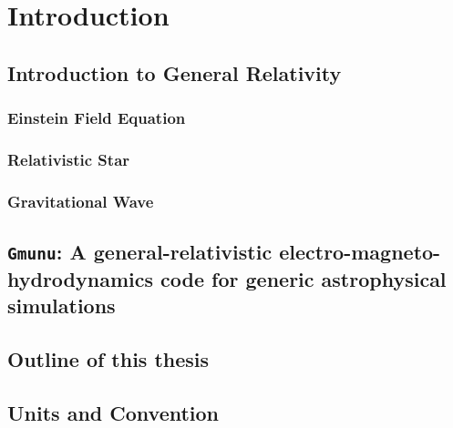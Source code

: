 
\chapter{Introduction}  %

\ifpdf
    \graphicspath{{Chapter1/Figs/PDF/}{Chapter1/Figs/}}
\else
    \graphicspath{{Chapter1/Figs/}}
\fi


\section{Introduction to General Relativity} %
\label{section1.1}

\subsection{Einstein Field Equation} %
\label{section1.1.1}

\subsection{Relativistic Star} %
\label{section1.1.2}

\subsection{Gravitational Wave} %
\label{section1.1.3}

\section{\texttt{Gmunu}: A general-relativistic electro-magneto-hydrodynamics code for generic astrophysical simulations} %

\section{Outline of this thesis}  %
\label{section1.3}

\section{Units and Convention}  %
\label{section1.4}


